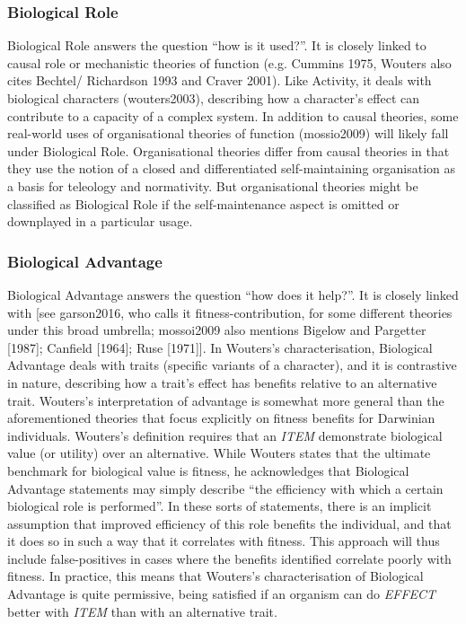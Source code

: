 \documentclass{article}
\begin{document}
\subsubsection{Biological Role}
\label{sec:biological-role}

Biological Role answers the question ``how is it used?''.
It is closely linked to causal role or mechanistic theories of function (e.g. Cummins 1975, Wouters also cites Bechtel/ Richardson 1993 and Craver 2001).
Like Activity, it deals with biological characters (wouters2003), describing how a character's effect can contribute to a capacity of a complex system.
In addition to causal theories, some real-world uses of organisational theories of function (mossio2009) will likely fall under Biological Role.
Organisational theories differ from causal theories in that they use the notion of a closed and differentiated self-maintaining organisation as a basis for teleology and normativity.
But organisational theories might be classified as Biological Role if the self-maintenance aspect is omitted or downplayed in a particular usage.

\subsubsection{Biological Advantage}
\label{sec:biological-advantage}

Biological Advantage answers the question ``how does it help?''.
It is closely linked with [see garson2016, who calls it fitness-contribution, for some different theories under this broad umbrella; mossoi2009 also mentions Bigelow and Pargetter [1987]; Canfield [1964]; Ruse [1971]].
In Wouters's characterisation, Biological Advantage deals with traits (specific variants of a character), and it is contrastive in nature, describing how a trait's effect has benefits relative to an alternative trait.
Wouters's interpretation of advantage is somewhat more general than the aforementioned theories that focus explicitly on fitness benefits for Darwinian individuals.
Wouters's definition requires that an \emph{ITEM} demonstrate biological value (or utility) over an alternative.
While Wouters states that the ultimate benchmark for biological value is fitness, he acknowledges that Biological Advantage statements may simply describe ``the efficiency with which a certain biological role is performed''.
In these sorts of statements, there is an implicit assumption that improved efficiency of this role benefits the individual, and that it does so in such a way that it correlates with fitness.
This approach will thus include false-positives in cases where the benefits identified correlate poorly with fitness.
In practice, this means that Wouters's characterisation of Biological Advantage is quite permissive, being satisfied if an organism can do \emph{EFFECT} better with \emph{ITEM} than with an alternative trait.
\end{document}
